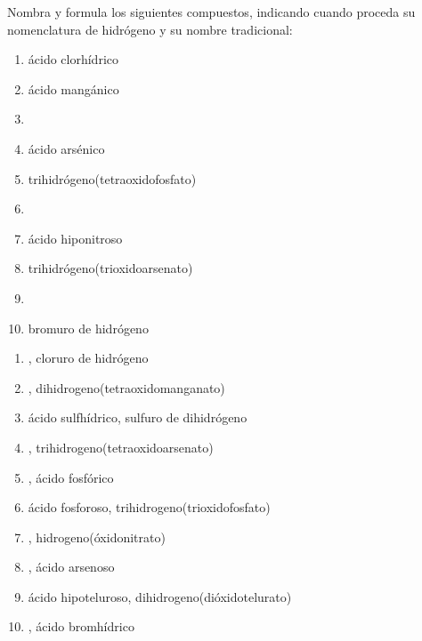 \documentclass[10pt,a5paper,twoside]{article}
\begin{document}
\begin{exercise}[
  tags    = {inorgánica,ácidos,ácidos binarios,ácidos ternarios,oxoácidos},
  topics  = {química inorgánica,formulación,nomenclatura},
  source  = {SAN Formulación, p28, e35},
  ]
  Nombra y formula los siguientes compuestos, indicando cuando proceda su nomenclatura de hidrógeno y su nombre tradicional:

  \begin{enumerate}
    \item ácido clorhídrico
    \item ácido mangánico
    \item {}
    \item ácido arsénico
    \item trihidrógeno(tetraoxidofosfato)
    \item {}
    \item ácido hiponitroso
    \item trihidrógeno(trioxidoarsenato)
    \item {}
    \item bromuro de hidrógeno
  \end{enumerate}
\end{exercise}

\begin{solution}
  \begin{enumerate}
    \item {}, cloruro de hidrógeno
    \item {}, dihidrogeno(tetraoxidomanganato)
    \item ácido sulfhídrico, sulfuro de dihidrógeno
    \item {}, trihidrogeno(tetraoxidoarsenato)
    \item {}, ácido fosfórico
    \item ácido fosforoso, trihidrogeno(trioxidofosfato)
    \item {}, hidrogeno(óxidonitrato)
    \item {}, ácido arsenoso
    \item ácido hipoteluroso, dihidrogeno(dióxidotelurato)
    \item {}, ácido bromhídrico
  \end{enumerate}
\end{solution}
\end{document}
